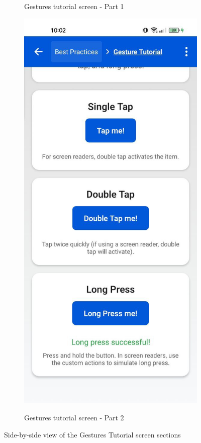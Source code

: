 \begin{figure}[ht]
\begin{subfigure}[b]{0.48\textwidth}
        \caption{Gestures tutorial screen - Part 1}
        \label{fig:gestures-left}
    \end{subfigure}
    \hfill
    \begin{subfigure}[b]{0.48\textwidth}
        \centering
        \includegraphics[width=\linewidth, alt={Second part of the Gestures tutorial screen}]{img/gestures2.jpg}
        \caption{Gestures tutorial screen - Part 2}
        \label{fig:gestures-right}
    \end{subfigure}
    \caption{Side-by-side view of the Gestures Tutorial screen sections}
    \label{fig:gestures_screens_sidebyside}
\end{figure}

